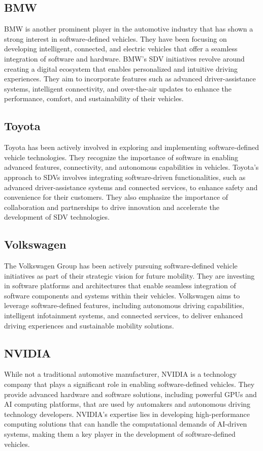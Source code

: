 \documentclass[
12pt,
oneside, 
onehalfspacing, 
nolistspacing, 
parskip, 
chapterinoneline, 
]{AASTCOMPUTER}
\begin{document}
\subsection{BMW}
BMW is another prominent player in the automotive industry that has shown a strong interest in software-defined vehicles. They have been focusing on developing intelligent, connected, and electric vehicles that offer a seamless integration of software and hardware. BMW's SDV initiatives revolve around creating a digital ecosystem that enables personalized and intuitive driving experiences. They aim to incorporate features such as advanced driver-assistance systems, intelligent connectivity, and over-the-air updates to enhance the performance, comfort, and sustainability of their vehicles.
\subsection{Toyota}
Toyota has been actively involved in exploring and implementing software-defined vehicle technologies. They recognize the importance of software in enabling advanced features, connectivity, and autonomous capabilities in vehicles. Toyota's approach to SDVs involves integrating software-driven functionalities, such as advanced driver-assistance systems and connected services, to enhance safety and convenience for their customers. They also emphasize the importance of collaboration and partnerships to drive innovation and accelerate the development of SDV technologies.
\subsection{Volkswagen}
The Volkswagen Group has been actively pursuing software-defined vehicle initiatives as part of their strategic vision for future mobility. They are investing in software platforms and architectures that enable seamless integration of software components and systems within their vehicles. Volkswagen aims to leverage software-defined features, including autonomous driving capabilities, intelligent infotainment systems, and connected services, to deliver enhanced driving experiences and sustainable mobility solutions.
\subsection{NVIDIA}
While not a traditional automotive manufacturer, NVIDIA is a technology company that plays a significant role in enabling software-defined vehicles. They provide advanced hardware and software solutions, including powerful GPUs and AI computing platforms, that are used by automakers and autonomous driving technology developers. NVIDIA's expertise lies in developing high-performance computing solutions that can handle the computational demands of AI-driven systems, making them a key player in the development of software-defined vehicles.
\end{document}
